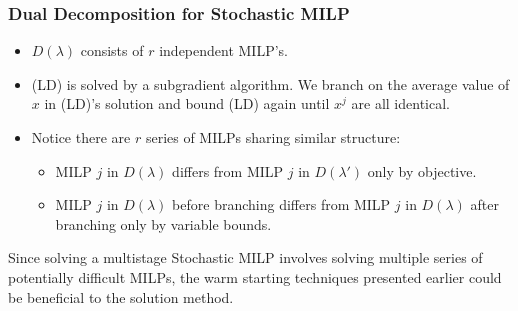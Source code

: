 \documentclass{beamer}
\begin{document}
	\begin{frame}[t]
		\frametitle{Dual Decomposition for Stochastic MILP}
		\small
		\vspace{0cm}
		\begin{itemize}
			\item $ D(\lambda) $ consists of $ r $ independent MILP's.
			\item (LD) is solved by a subgradient algorithm. We branch on the average value of $ x $ in (LD)'s solution and bound (LD) again until $ x^j $ are all identical.
			\item Notice there are $ r $ series of MILPs sharing similar structure:
			\begin{itemize}
				\item MILP $ j $ in $ D(\lambda) $ differs from MILP $ j $ in $ D(\lambda') $ only by objective.
				\item MILP $ j $ in $ D(\lambda) $ before branching differs from MILP $ j $ in $ D(\lambda) $ after branching only by variable bounds.
			\end{itemize}
		\end{itemize}
		\vspace{1.5cm}
		\begin{block}{}
			Since solving a multistage Stochastic MILP involves solving multiple series of potentially difficult MILPs, the warm starting techniques presented earlier could be beneficial to the solution method.
		\end{block}
		\normalsize
	\end{frame}
	
\end{document}
